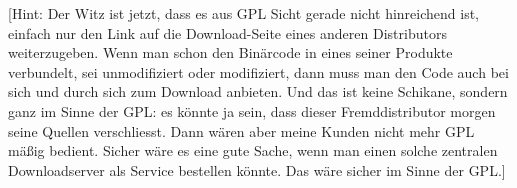 \documentclass[DIV=calc,BCOR=5mm,11pt,headings=small,oneside,abstract=true, toc=bib]{scrartcl}
\begin{document}
[Hint: Der Witz ist jetzt, dass es aus GPL Sicht gerade nicht hinreichend ist,
einfach nur den Link auf die Download-Seite eines anderen
Distributors weiterzugeben. Wenn man schon den Binärcode in eines seiner
Produkte verbundelt, sei unmodifiziert oder modifiziert, dann muss man den Code
auch bei sich und durch sich zum Download anbieten. Und das ist keine Schikane,
sondern ganz im Sinne der GPL: es könnte ja sein, dass dieser Fremddistributor
morgen seine Quellen verschliesst. Dann wären aber meine Kunden nicht mehr GPL
mäßig bedient. Sicher wäre es eine gute Sache, wenn man einen solche zentralen
Downloadserver als Service bestellen könnte. Das wäre sicher im Sinne der GPL.]

\small

\end{document}
